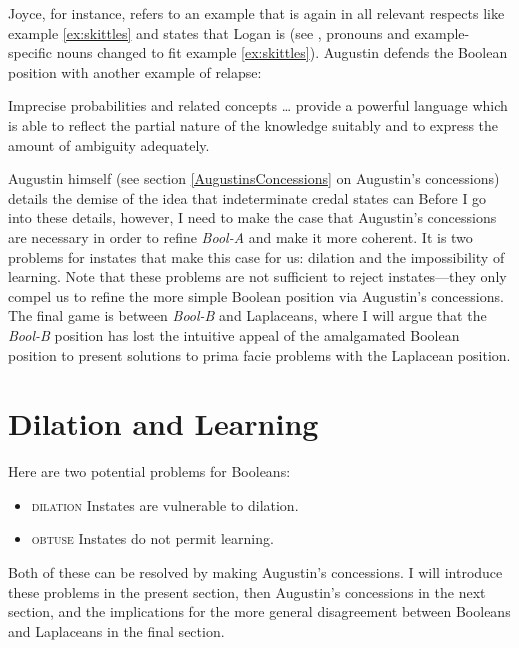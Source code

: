 \documentclass[11pt]{article}
\newcommand{\anderson}[0]{\textit{Bool-A}}
\newcommand{\augustin}[0]{\textit{Bool-B}}
\begin{document}
Joyce, for instance, refers to an example that is again in all
relevant respects like example \ref{ex:skittles} and states that Logan
is  (see ,
pronouns and example-specific nouns changed to fit example
\ref{ex:skittles}). Augustin defends the Boolean position with another
example of relapse:

\begin{quotex}
  Imprecise probabilities and related concepts {\ldots} provide a
  powerful language which is able to reflect the partial nature of the
  knowledge suitably and to express the amount of ambiguity
  adequately. 
\end{quotex}

Augustin himself (see section \ref{AugustinsConcessions} on Augustin's
concessions) details the demise of the idea that indeterminate credal
states can  Before
I go into these details, however, I need to make the case that
Augustin's concessions are necessary in order to refine {\anderson}
and make it more coherent. It is two problems for instates that make
this case for us: dilation and the impossibility of learning. Note
that these problems are not sufficient to reject instates---they only
compel us to refine the more simple Boolean position via Augustin's
concessions. The final game is between {\augustin} and Laplaceans,
where I will argue that the {\augustin} position has lost the
intuitive appeal of the amalgamated Boolean position to present
solutions to prima facie problems with the Laplacean position.

\section{Dilation and Learning}
\label{DilationLearningAndEntropy}

Here are two potential problems for Booleans:

\begin{itemize}
\item \textsc{dilation} Instates are vulnerable to dilation.
\item \textsc{obtuse} Instates do not permit learning.
\end{itemize}

Both of these can be resolved by making Augustin's concessions. I will
introduce these problems in the present section, then Augustin's
concessions in the next section, and the implications for the more
general disagreement between Booleans and Laplaceans in the final
section.
\end{document}
